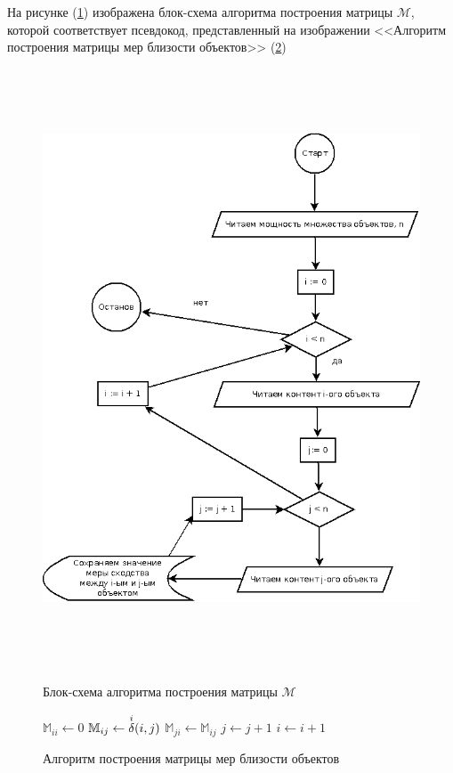 На рисунке (\ref{dia:matrix}) изображена блок-схема алгоритма
построения матрицы $\mathcal{M}$, которой соответствует псевдокод, представленный на изображении <<Алгоритм построения матрицы мер близости объектов>>  (\ref{alg:matrix})
\begin{figure}[htb]
	\caption{Блок-схема алгоритма построения матрицы $\mathcal{M}$}
\begin{center}
	\label{dia:matrix}
 \includegraphics[width=6in,height=7in]{pics/algs/matrix.png}
\end{center}
\end{figure}

\begin{figure}[htb]
\caption{Алгоритм построения матрицы мер близости объектов}
\label{alg:matrix}
\begin{algorithmic}[1]
	\State $\mathbb{M}_{ii} \gets 0$ 
  \State $\mathbb{M}_{ij} \gets {\overset{i}{\mathcal{\delta}}}(i,j)$
  \State $\mathbb{M}_{ji} \gets \mathbb{M}_{ij}$
  \State $j \gets j + 1$
  \EndFor
\State $i \gets i + 1$
\EndFor
\end{algorithmic}
\end{figure}

